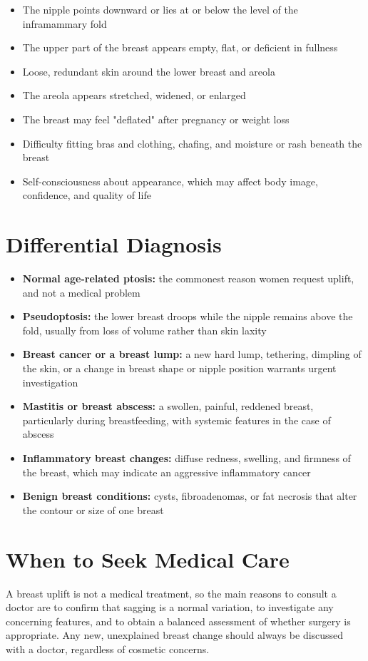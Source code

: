\begin{itemize}
    \item The nipple points downward or lies at or below the level of the inframammary fold
    \item The upper part of the breast appears empty, flat, or deficient in fullness
    \item Loose, redundant skin around the lower breast and areola
    \item The areola appears stretched, widened, or enlarged
    \item The breast may feel "deflated" after pregnancy or weight loss
    \item Difficulty fitting bras and clothing, chafing, and moisture or rash beneath the breast
    \item Self-consciousness about appearance, which may affect body image, confidence, and quality of life
\end{itemize}

\section*{Differential Diagnosis}
\begin{itemize}
    \item \textbf{Normal age-related ptosis:} the commonest reason women request uplift, and not a medical problem
    \item \textbf{Pseudoptosis:} the lower breast droops while the nipple remains above the fold, usually from loss of volume rather than skin laxity
    \item \textbf{Breast cancer or a breast lump:} a new hard lump, tethering, dimpling of the skin, or a change in breast shape or nipple position warrants urgent investigation
    \item \textbf{Mastitis or breast abscess:} a swollen, painful, reddened breast, particularly during breastfeeding, with systemic features in the case of abscess
    \item \textbf{Inflammatory breast changes:} diffuse redness, swelling, and firmness of the breast, which may indicate an aggressive inflammatory cancer
    \item \textbf{Benign breast conditions:} cysts, fibroadenomas, or fat necrosis that alter the contour or size of one breast
\end{itemize}

\section*{When to Seek Medical Care}
A breast uplift is not a medical treatment, so the main reasons to consult a doctor are to confirm that sagging is a normal variation, to investigate any concerning features, and to obtain a balanced assessment of whether surgery is appropriate. Any new, unexplained breast change should always be discussed with a doctor, regardless of cosmetic concerns.

